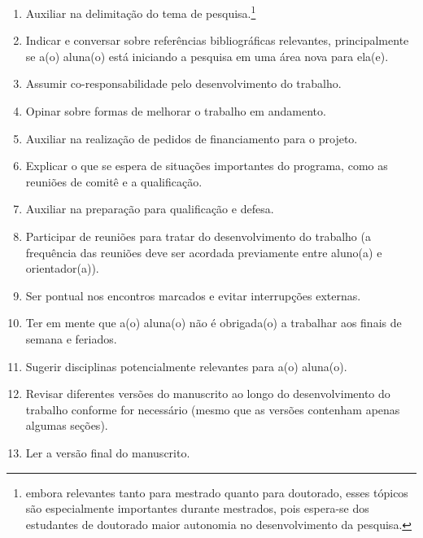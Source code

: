 \documentclass[twoside a4paper 12pt]{report}
\begin{document}
\begin{enumerate}
\item Auxiliar na delimitação do tema de pesquisa.\footnote{embora relevantes tanto para mestrado quanto para doutorado, esses tópicos são especialmente importantes durante mestrados, pois espera-se dos estudantes de doutorado maior autonomia no desenvolvimento da pesquisa.\label{fn:om1}}
\item Indicar e conversar sobre referências bibliográficas relevantes, principalmente se a(o) aluna(o) está iniciando a pesquisa em uma área nova para ela(e).
\item Assumir co-responsabilidade pelo desenvolvimento do trabalho.
\item Opinar sobre formas de melhorar o trabalho em andamento.
\item Auxiliar na realização de pedidos de financiamento para o projeto.
\item Explicar o que se espera de situações importantes do programa, como as reuniões de comitê e a qualificação.
\item Auxiliar na preparação para qualificação e defesa.
\item Participar de reuniões para tratar do desenvolvimento do trabalho (a frequência das reuniões deve ser acordada previamente entre aluno(a) e orientador(a)).
\item Ser pontual nos encontros marcados e evitar interrupções externas.
\item Ter em mente que a(o) aluna(o) não é obrigada(o) a trabalhar aos finais de semana e feriados.
\item Sugerir disciplinas potencialmente relevantes para a(o) aluna(o). 
\item Revisar diferentes versões do manuscrito ao longo do desenvolvimento do trabalho conforme for necessário (mesmo que as versões contenham apenas algumas seções).
\item Ler a versão final do manuscrito.
\end{enumerate}
\end{document}

